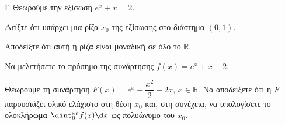 \begin{thema}{Γ}
Θεωρούμε την εξίσωση $e^x + x = 2$.
\begin{erwthma}
  \item Δείξτε ότι υπάρχει μια ρίζα $x_0$ της εξίσωσης στο διάστημα $(0, 1)$.
  \item Αποδείξτε ότι αυτή η ρίζα είναι μοναδική σε όλο το $\mathbb{R}$.
  \item Να μελετήσετε το πρόσημο της συνάρτησης $f(x)=e^x+x-2$.
  \item Θεωρούμε τη συνάρτηση $F(x) = e^x + \dfrac{x^2}{2} - 2x$, $x \in \mathbb{R}$. Να αποδείξετε ότι η $F$ παρουσιάζει ολικό ελάχιστο στη θέση $x_0$ και, στη συνέχεια, να υπολογίσετε το ολοκλήρωμα $\dint_0^{x_0} f(x) \d x$ ως πολυώνυμο του $x_0$.
\end{erwthma}
\end{thema}
